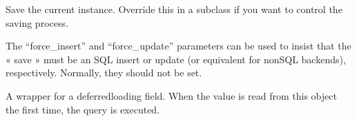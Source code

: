 \documentclass[letterpaper,10pt,french]{sphinxmanual}
\begin{document}
\begin{fulllineitems}
\begin{fulllineitems}
\end{fulllineitems}


\begin{fulllineitems}
\label{\detokenize{main/model:main.models.Fournisseur.objects}}
\pysigstartsignatures
{}
\pysigstopsignatures
\end{fulllineitems}


\begin{fulllineitems}
\label{\detokenize{main/model:main.models.Fournisseur.save}}
\pysigstartsignatures
{}
\pysigstopsignatures
\sphinxAtStartPar
Save the current instance. Override this in a subclass if you want to
control the saving process.

\sphinxAtStartPar
The “force\_insert” and “force\_update” parameters can be used to insist
that the « save » must be an SQL insert or update (or equivalent for
non\sphinxhyphen{}SQL backends), respectively. Normally, they should not be set.

\end{fulllineitems}


\begin{fulllineitems}
\label{\detokenize{main/model:main.models.Fournisseur.type}}
\pysigstartsignatures
{}
\pysigstopsignatures
\sphinxAtStartPar
A wrapper for a deferred\sphinxhyphen{}loading field. When the value is read from this
object the first time, the query is executed.

\end{fulllineitems}


\end{fulllineitems}

\end{document}
